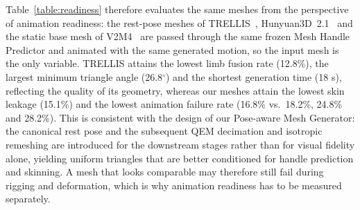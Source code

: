 \documentclass[lettersize,journal]{IEEEtran}
\newcommand{\blu}[1]{\texorpdfstring{{\leavevmode\color{blue}#1}}{#1}}
\begin{document}
\blu{Table~\ref{table:readiness} therefore evaluates the same meshes from
the perspective of animation readiness: the rest-pose meshes of TRELLIS~\cite{xiang2025structured},
Hunyuan3D~2.1~\cite{hunyuan3d2025hunyuan3d} and the static base mesh of V2M4~\cite{chen2025v2m4} are passed
through the same frozen Mesh Handle Predictor and animated with the same generated motion,
so the input mesh is the only variable. TRELLIS attains the lowest limb fusion rate
(12.8\%), the largest minimum triangle angle (26.8$^{\circ}$) and the shortest generation
time (18 s), reflecting the quality of its geometry, whereas our meshes attain the lowest
skin leakage (15.1\%) and the lowest animation failure rate (16.8\% vs.\ 18.2\%, 24.8\% and
28.2\%). This is consistent with the design of our Pose-aware Mesh Generator: the canonical
rest pose and the subsequent QEM decimation and isotropic remeshing are introduced for the
downstream stages rather than for visual fidelity alone, yielding uniform triangles that are
better conditioned for handle prediction and skinning. A mesh that looks comparable may
therefore still fail during rigging and deformation, which is why animation readiness has to
be measured separately.}
\end{document}
